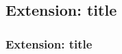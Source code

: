 \subsection{{Extension: {title}}}
\begin{{frame}}
    \frametitle{{Extension: {title}}}
    \begin{{itemize}}
        \item
    \end{{itemize}}
\end{{frame}}